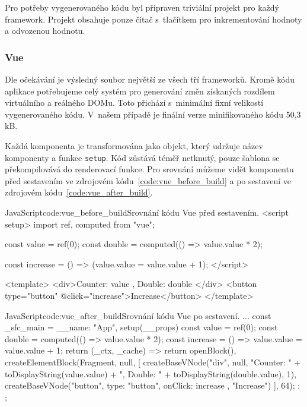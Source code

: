 \documentclass[
  master,
  program=ainf,
  tables=false,
  sourcecodes,
  glossaries,
  index
]{kidiplom}
\begin{document}
Pro potřeby vygenerovaného kódu byl připraven triviální projekt pro každý framework. 
Projekt obsahuje pouze čítač s~tlačítkem pro inkrementování hodnoty a odvozenou hodnotu. 

\subsubsection{Vue}
Dle očekávání je výsledný soubor největší ze všech tří frameworků. Kromě kódu aplikace potřebujeme celý systém
pro generování změn získaných rozdílem virtuálního a reálného DOMu. Toto přichází s~minimální fixní velikostí
vygenerovaného kódu. V~našem případě je finální verze minifikovaného kódu 50,3 kB.

Každá komponenta je transformována jako objekt, který udržuje název komponenty a funkce {\tt setup}.
Kód zůstává téměř netknutý, pouze šablona se překompilovává
do renderovací funkce. Pro srovnání můžeme vidět komponentu před sestavením ve zdrojovém kódu~\ref{code:vue_before_build} a
po sestavení ve zdrojovém kódu~\ref{code:vue_after_build}. 

  \begin{kicode}{JavaScript}{code:vue_before_build}{Srovnání kódu Vue před sestavením.}
    <script setup>
      import { ref, computed } from "vue";

      const value = ref(0);
      const double = computed(() => value.value * 2);

      const increase = () => (value.value = value.value + 1);
    </script>

    <template>
      <div>Counter: {{ value }}, Double: {{ double }}</div>
      <button type="button" @click="increase">Increase</button>
    </template>
\end{kicode}

  \begin{kicode}{JavaScript}{code:vue_after_build}{Srovnání kódu Vue po sestavení.}
    ...
    const _sfc_main = {
      __name: "App",
      setup(__props) {
        const value = ref(0);
        const double = computed(() => value.value * 2);
        const increase = () => value.value = value.value + 1;
        return (_ctx, _cache) => {
          return openBlock(), createElementBlock(Fragment, null, [
            createBaseVNode("div", null, "Counter: " + toDisplayString(value.value) + ", Double: " + toDisplayString(double.value), 1),
            createBaseVNode("button", {
              type: "button",
              onClick: increase
            }, "Increase")
          ], 64);
        };
      }
    };
\end{kicode}
\end{document}
